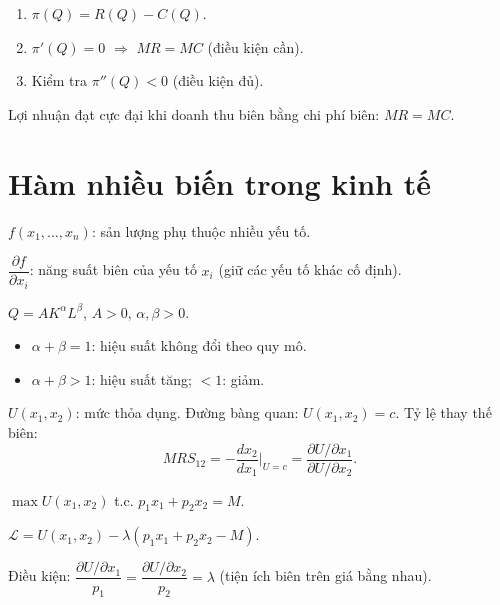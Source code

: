 \documentclass[12pt,a4paper]{article}
\begin{document}
\begin{phuongphap}[title={Tìm mức sản lượng tối đa hóa lợi nhuận}]
  \begin{enumerate}
    \item $\pi(Q) = R(Q) - C(Q)$.
    \item $\pi'(Q) = 0$ $\Rightarrow$ $MR = MC$ (điều kiện cần).
    \item Kiểm tra $\pi''(Q) < 0$ (điều kiện đủ).
  \end{enumerate}
\end{phuongphap}

\begin{dinhly}
  Lợi nhuận đạt cực đại khi doanh thu biên bằng chi phí biên: $MR = MC$.
\end{dinhly}

\section{Hàm nhiều biến trong kinh tế}

\begin{dinhnghia}[title={Đạo hàm riêng và ý nghĩa}]
  $f(x_1, \ldots, x_n)$: sản lượng phụ thuộc nhiều yếu tố.

  $\dfrac{\partial f}{\partial x_i}$: năng suất biên của yếu tố $x_i$ (giữ các yếu tố khác cố định).
\end{dinhnghia}

\begin{dinhnghia}[title={Hàm sản xuất Cobb--Douglas}]
  $Q = AK^\alpha L^\beta$, $A > 0$, $\alpha, \beta > 0$.
  \begin{itemize}
    \item $\alpha + \beta = 1$: hiệu suất không đổi theo quy mô.
    \item $\alpha + \beta > 1$: hiệu suất tăng; $< 1$: giảm.
  \end{itemize}
\end{dinhnghia}

\begin{dinhnghia}[title={Hàm tiện ích}]
  $U(x_1, x_2)$: mức thỏa dụng. Đường bàng quan: $U(x_1, x_2) = c$. Tỷ lệ thay thế biên:
  \[
    MRS_{12} = -\frac{dx_2}{dx_1}\bigg|_{U = c} = \frac{\partial U/\partial x_1}{\partial U/\partial x_2}.
  \]
\end{dinhnghia}

\begin{phuongphap}[title={Tối ưu có ràng buộc --- Lagrange}]
  $\max U(x_1, x_2)$ t.c. $p_1 x_1 + p_2 x_2 = M$.

  $\mathcal{L} = U(x_1, x_2) - \lambda(p_1 x_1 + p_2 x_2 - M)$.

  Điều kiện: $\dfrac{\partial U/\partial x_1}{p_1} = \dfrac{\partial U/\partial x_2}{p_2} = \lambda$ (tiện ích biên trên giá bằng nhau).
\end{phuongphap}
\end{document}
